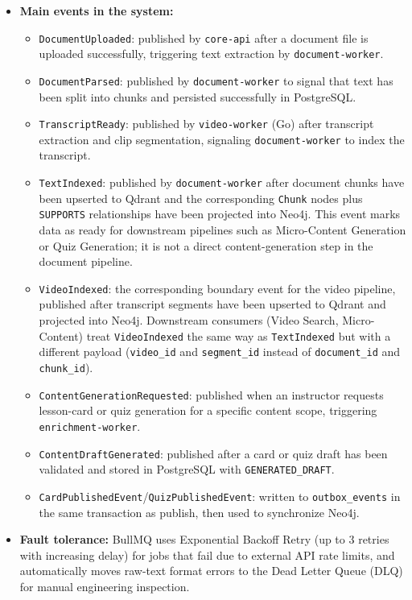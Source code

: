 \begin{itemize}
    \item \textbf{Main events in the system:}
    \begin{itemize}
        \item \texttt{DocumentUploaded}: published by \texttt{core-api}
              after a document file is uploaded successfully, triggering
              text extraction by \texttt{document-worker}.
        \item \texttt{DocumentParsed}: published by
              \texttt{document-worker} to signal that text has been split
              into chunks and persisted successfully in PostgreSQL.
        \item \texttt{TranscriptReady}: published by \texttt{video-worker}
              (Go) after transcript extraction and clip segmentation,
              signaling \texttt{document-worker} to index the transcript.
        \item \texttt{TextIndexed}: published by \texttt{document-worker}
              after document chunks have been upserted to Qdrant and the
              corresponding \texttt{Chunk} nodes plus \texttt{SUPPORTS}
              relationships have been projected into Neo4j. This event
              marks data as ready for downstream pipelines such as
              Micro-Content Generation or Quiz Generation; it is not a
              direct content-generation step in the document pipeline.
        \item \texttt{VideoIndexed}: the corresponding boundary event for
              the video pipeline, published after transcript segments
              have been upserted to Qdrant and projected into Neo4j.
              Downstream consumers (Video Search, Micro-Content) treat
              \texttt{VideoIndexed} the same way as \texttt{TextIndexed}
              but with a different payload (\texttt{video\_id} and
              \texttt{segment\_id} instead of \texttt{document\_id} and
              \texttt{chunk\_id}).
        \item \texttt{ContentGenerationRequested}: published when an
              instructor requests lesson-card or quiz generation for a
              specific content scope, triggering \texttt{enrichment-worker}.
        \item \texttt{ContentDraftGenerated}: published after a card or
              quiz draft has been validated and stored in PostgreSQL with
              \texttt{GENERATED\_DRAFT}.
        \item \texttt{CardPublishedEvent}/\texttt{QuizPublishedEvent}:
              written to \texttt{outbox\_events} in the same transaction
              as publish, then used to synchronize Neo4j.
    \end{itemize}
    \item \textbf{Fault tolerance:} BullMQ uses Exponential Backoff Retry
          (up to 3 retries with increasing delay) for jobs that fail due
          to external API rate limits, and automatically moves raw-text
          format errors to the Dead Letter Queue (DLQ) for manual
          engineering inspection.
\end{itemize}

